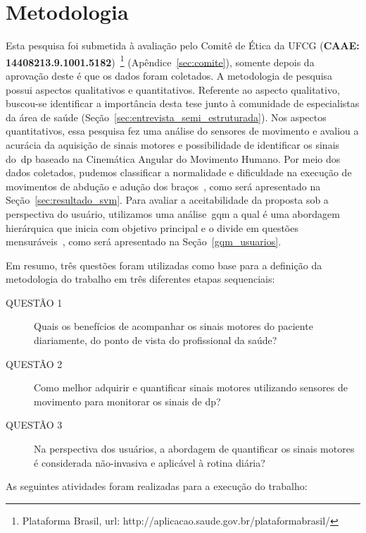 \section{Metodologia}
Esta pesquisa foi submetida à avaliação pelo Comitê de Ética da UFCG (\textbf{CAAE: 14408213.9.1001.5182})~\footnote{Plataforma Brasil, url: http://aplicacao.saude.gov.br/plataformabrasil/} (Apêndice~\ref{sec:comite}), somente depois da aprovação deste é que os dados foram coletados. A metodologia de pesquisa possui aspectos qualitativos e quantitativos. Referente ao aspecto qualitativo, buscou-se identificar a importância desta tese junto à comunidade de especialistas da área de saúde (Seção~\ref{sec:entrevista_semi_estruturada}). Nos aspectos quantitativos, essa pesquisa fez uma análise do sensores de movimento e avaliou a acurácia da aquisição de sinais motores e possibilidade de identificar os sinais do~\ac{dp} baseado na Cinemática Angular do Movimento Humano. Por meio dos dados coletados, pudemos classificar a normalidade e dificuldade na execução de movimentos de abdução e adução dos braços~\cite{mcginnis2013biomechanics}, como será apresentado na Seção~\ref{sec:resultado_svm}. Para avaliar a aceitabilidade da proposta sob a perspectiva do usuário, utilizamos uma análise~\ac{gqm} a qual é uma abordagem hierárquica que inicia com objetivo principal e o divide em questões mensuráveis~\cite{saraiva2006}, como será apresentado na Seção~\ref{gqm_usuarios}.

Em resumo, três questões foram utilizadas como base para a definição da metodologia do trabalho em três diferentes etapas sequenciais:
	\begin{description}
	\item[QUESTÃO 1] Quais os benefícios de acompanhar os sinais motores do paciente diariamente, do ponto de vista do profissional da saúde?
	\item[QUESTÃO 2] Como melhor adquirir e quantificar sinais motores utilizando sensores de movimento para monitorar os sinais de \ac{dp}?
	\item[QUESTÃO 3] Na perspectiva dos usuários, a abordagem de quantificar os sinais motores é considerada não-invasiva e aplicável à rotina diária?
	\end{description}

As seguintes atividades foram realizadas para a execução do trabalho:

